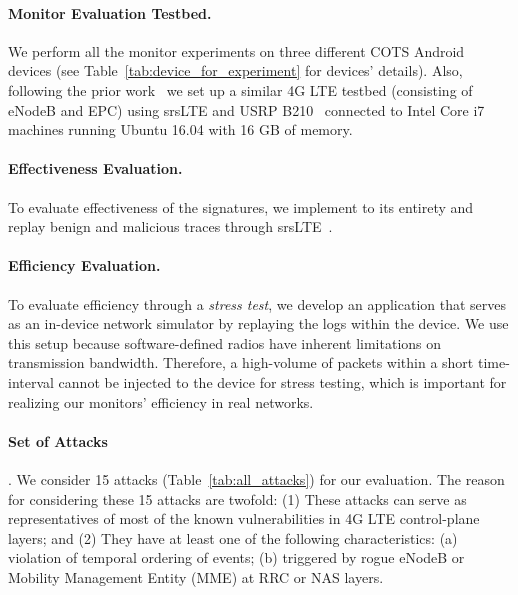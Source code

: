 \paragraph{Monitor Evaluation Testbed.}
We perform all the monitor experiments on three different
COTS Android devices (see Table~\ref{tab:device_for_experiment}
for devices' details).
Also, following the prior work~\cite{alter,lteinspector,kim_ltefuzz_sp19} we set up a similar 4G LTE testbed (consisting of eNodeB and EPC) using
srsLTE \cite{gomez2016srslte} and USRP B210~\cite{usrp} connected to Intel
Core i7 machines running Ubuntu 16.04 with 16 GB of memory.

\paragraph{Effectiveness Evaluation.}
To evaluate effectiveness of the signatures, we implement \system to its entirety
and replay benign and malicious traces through srsLTE~\cite{gomez2016srslte}.

\paragraph{Efficiency Evaluation.}
To evaluate efficiency through a \emph{stress test}, we develop an application that serves
as an in-device network simulator by replaying the logs within the device. We use this  setup because software-defined radios
have inherent limitations on transmission bandwidth. Therefore, a high-volume of packets within a short time-interval cannot be injected to the device for stress testing, which is important for realizing our monitors' efficiency in real networks.

\paragraph{Set of Attacks}.
\label{sec:set_of_attacks}
We consider 15 attacks (Table~\ref{tab:all_attacks}) for our evaluation.
The reason for considering these 15 attacks are twofold:
(1) These attacks can serve as representatives of
most of the known vulnerabilities in 4G LTE control-plane layers;
and (2) They have at least one of the following characteristics:
(a) violation of temporal ordering of events;
(b)  triggered by rogue eNodeB or Mobility Management Entity (MME) at RRC or NAS layers.
%



